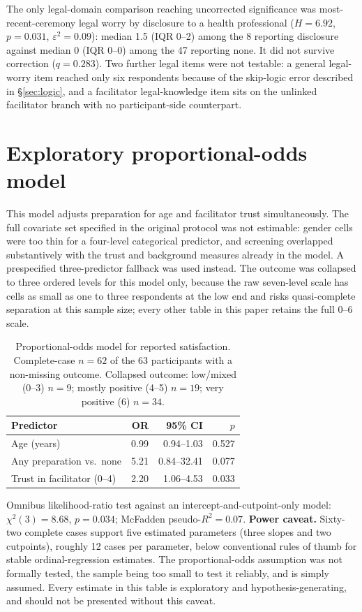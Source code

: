 \documentclass[12pt]{article}
\begin{document}
\noindent
The only legal-domain comparison reaching uncorrected significance was most-recent-ceremony legal worry by
disclosure to a health professional ($H=6.92$, $p=0.031$, $\varepsilon^2=0.09$): median 1.5 (IQR 0--2) among
the 8 reporting disclosure against median 0 (IQR 0--0) among the 47 reporting none. It did not survive
correction ($q=0.283$). Two further legal items were not testable: a general legal-worry item reached only
six respondents because of the skip-logic error described in \S\ref{sec:logic}, and a facilitator
legal-knowledge item sits on the unlinked facilitator branch with no participant-side counterpart.

\section{Exploratory proportional-odds model}

This model adjusts preparation for age and facilitator trust simultaneously. The full covariate set
specified in the original protocol was not estimable: gender cells were too thin for a four-level
categorical predictor, and screening overlapped substantively with the trust and background measures
already in the model. A prespecified three-predictor fallback was used instead. The outcome was collapsed
to three ordered levels for this model only, because the raw seven-level scale has cells as small as one to
three respondents at the low end and risks quasi-complete separation at this sample size; every other table
in this paper retains the full 0--6 scale.

\begin{table}[htbp]
\centering
\caption{Proportional-odds model for reported satisfaction. Complete-case $n=62$ of the 63 participants
with a non-missing outcome. Collapsed outcome: low/mixed (0--3) $n=9$; mostly positive (4--5) $n=19$; very
positive (6) $n=34$.}
\begin{tabular}{lrrr}
\toprule
Predictor & OR & 95\% CI & $p$ \\
\midrule
Age (years) & 0.99 & 0.94--1.03 & 0.527 \\
Any preparation vs.\ none & 5.21 & 0.84--32.41 & 0.077 \\
Trust in facilitator (0--4) & 2.20 & 1.06--4.53 & 0.033 \\
\bottomrule
\end{tabular}
\end{table}

\noindent
Omnibus likelihood-ratio test against an intercept-and-cutpoint-only model: $\chi^2(3)=8.68$, $p=0.034$;
McFadden pseudo-$R^2=0.07$. \textbf{Power caveat.} Sixty-two complete cases support five estimated
parameters (three slopes and two cutpoints), roughly 12 cases per parameter, below conventional rules of
thumb for stable ordinal-regression estimates. The proportional-odds assumption was not formally tested,
the sample being too small to test it reliably, and is simply assumed. Every estimate in this table is
exploratory and hypothesis-generating, and should not be presented without this caveat.
\end{document}
